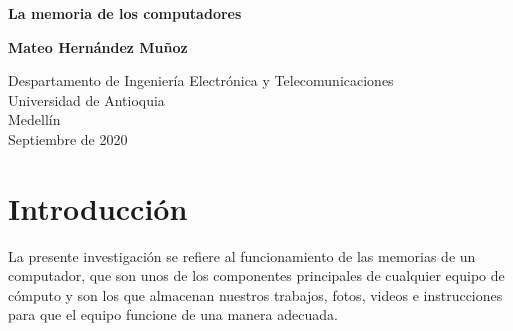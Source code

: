 \documentclass{article}
\begin{document}
	\large
	\begin{titlepage}
		\begin{center}
			\vspace*{1cm}
			
			\Huge
			\textbf{La memoria de los computadores}
			
			\vspace{0.5cm}
			\LARGE
			
			\vspace{1.5cm}
			
			\textbf{Mateo Hernández Muñoz}
			
			\vfill
			
			\vspace{0.8cm}
			
			\Large
			Despartamento de Ingeniería Electrónica y Telecomunicaciones\\
			Universidad de Antioquia\\
			Medellín\\
			Septiembre de 2020
			
		\end{center}
	\end{titlepage}
	
	\tableofcontents
	\section{Introducción}
	La presente investigación se refiere al funcionamiento de las memorias de un computador, que son unos de los componentes principales de cualquier equipo de cómputo y son los que almacenan nuestros trabajos, fotos, videos e instrucciones para que el equipo funcione de una manera adecuada.
	
\end{document}
